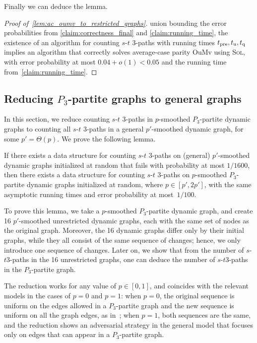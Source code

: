 \documentclass[letter,11pt]{article}
\newcommand{\oumv}{\textnormal{\textsf{OuMv}}\xspace}
\newcommand{\st}{$s$-$t$\xspace}
\newcommand{\paths}[3]{${#1}$-${#2}$ ${#3}$-paths\xspace}
\newcommand{\sol}{\textsc{Sol}\xspace}
\newcommand{\tp}{t_{\textnormal{pre}}}
\newcommand{\tu}{t_{\textnormal{u}}}
\newcommand{\tq}{t_{\textnormal{q}}}
\begin{document}
Finally we can deduce the lemma.
\begin{proof}[Proof of~\cref{lem:ac_oumv_to_restricted_graphs}]
    union bounding the error probabilities from \cref{claim:correctness_final} and \cref{claim:running_time}, the existence of an algorithm for counting \paths{s}{t}{3} with running times $\tp, \tu, \tq$ implies an algorithm that correctly solves average-case parity \oumv using \sol, with error probability at most $0.04 + o(1) < 0.05$ and the running time from~\cref{claim:running_time}. 
\end{proof}

\subsection{Reducing $P_3$-partite graphs to general graphs}
\label{sec:lb:restricted_graphs_to_general_graphs}


In this section, we reduce counting \paths{s}{t}{3} in $p$-smoothed $P_3$-partite dynamic graphs to counting all \paths{s}{t}{3} in a general $p'$-smoothed dynamic graph, for some $p' = \Theta(p)$. We prove the following lemma.

\begin{lemma}
\label{lem:restricted_graphs_to_general_graphs}
    If there exists a data structure for counting \paths{s}{t}{3} on (general) $p'$-smoothed dynamic graphs initialized at random 
    that fails with probability at most $1/1600$,
    then there exists a data structure for counting \paths{s}{t}{3} on $p$-smoothed $P_3$-partite dynamic graphs initialized at random, where $p \in [p',2p']$, with the same asymptotic running times and error probability at most~$1/100$.
\end{lemma}

To prove this lemma, we take a $p$-smoothed $P_3$-partite dynamic graph, 
and create 16
$p'$-smoothed unrestricted dynamic graphs,
each with the same set of nodes as the original graph.
Moreover, the 16 dynamic graphs differ only by their initial graphs, while they all consist of the same sequence of changes;
hence, we only introduce one sequence of changes.
Later on, we show that from the number of 
\st $3$-paths in the 16 unrestricted graphs,
one can deduce the number of 
\st $3$-paths in the $P_3$-partite graph.

The reduction works for any value of $p\in[0,1]$, and coincides with the relevant models in the cases of $p=0$ and $p=1$:
when $p=0$, the original sequence is uniform on the edges allowed in  
a $P_3$-partite graph
and the new sequence is uniform on all the  graph edges, as in~\cite{HLS22};
when $p=1$, both sequences are the same, and the reduction shows an adversarial strategy in the general model that focuses only on edges that can appear in a $P_3$-partite graph.
 
\end{document}
